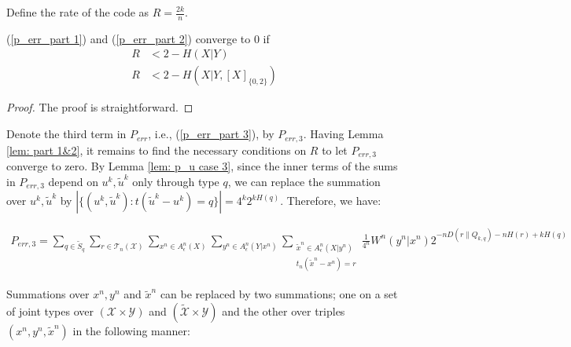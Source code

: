 Define the rate of the code as $R=\frac{2k}{n}$.
\begin{lem} \label{lem: part 1&2}
(\ref{p_err_part 1}) and (\ref{p_err_part 2}) converge to $0$ if 
\begin{align*}
R&<2-H(X|Y)\\
R&<2-H(X|Y,[X]_{\{ 0,2\}})
\end{align*}
\end{lem}


\begin{proof}
The proof is straightforward. 
\end{proof}

Denote the third term in $P_{err}$, i.e., (\ref{p_err_part 3}),  by $P_{err,3}$. Having Lemma \ref{lem: part 1&2}, it remains to find the necessary conditions on $R$ to let $P_{err,3}$ converge to zero. By Lemma \ref{lem: p_u case 3}, since the inner terms of the sums in $P_{err,3}$ depend on $u^k, \tilde{u}^k$ only through type $q$, we can replace the summation over $u^k, \tilde{u}^k$ by $|\{ (u^k, \tilde{u}^k):t(\tilde{u}^k-u^k)=q \}|=4^k 2^{kH(q)}$. Therefore, we have:

\begin{align*}
P_{err,3}=\sum_{q\in \tilde{S}_q}\sum_{r\in\mathcal{T}_n(\mathcal{X}) } \sum_{x^n\in A_\epsilon^n(X)} \sum_{y^n\in A_\epsilon^n(Y|x^n)} \sum_{\substack{\tilde{x}^n\in A_\epsilon^n(X|y^n)\\t_n(\tilde{x}^n-x^n)=r} } \frac{1}{4^n} W^n(y^n|x^n)2^{-nD(r\| Q_{k,q})-nH(r)+kH(q)}
\end{align*} 

Summations over $x^n, y^n$ and $\tilde{x}^n$ can be replaced by  two summations; one on a set of joint types over $(\mathcal{X}\times \mathcal{Y})$ and $(\tilde{\mathcal{X}} \times \mathcal{Y})$ and the other over triples $(x^n, y^n, \tilde{x}^n)$ in the following manner:


